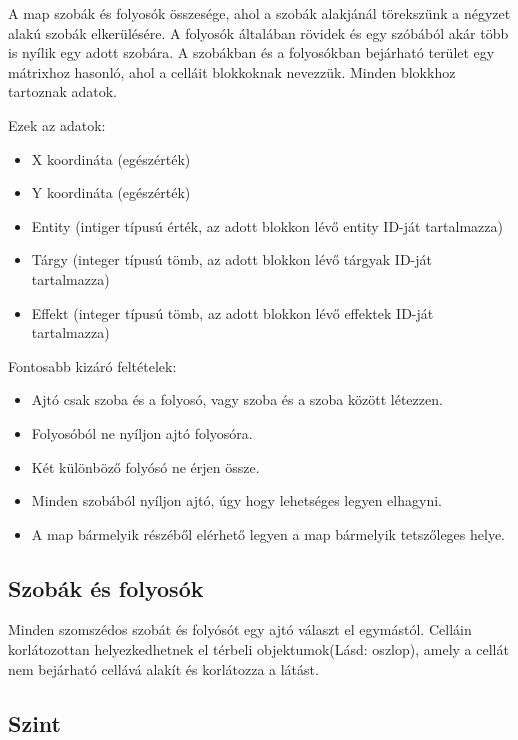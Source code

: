 A map szobák és folyosók összesége, ahol a szobák alakjánál törekszünk a négyzet alakú szobák elkerülésére. A folyosók általában rövidek és egy szóbából akár több is nyílik egy adott szobára.
A szobákban és a folyosókban bejárható terület egy mátrixhoz hasonló, ahol a celláit blokkoknak nevezzük.
Minden blokkhoz tartoznak adatok.

Ezek az adatok:

\begin{itemize}
    \item X koordináta (egészérték)
    \item Y koordináta (egészérték)
    \item Entity (intiger típusú érték,  az adott blokkon lévő entity ID-ját tartalmazza)
    \item Tárgy (integer típusú tömb, az adott blokkon lévő tárgyak ID-ját tartalmazza)
    \item Effekt (integer típusú tömb, az adott blokkon lévő effektek ID-ját tartalmazza)
\end{itemize}

Fontosabb kizáró feltételek:

\begin{itemize}
    \item Ajtó csak szoba és a folyosó, vagy szoba és a szoba között létezzen.
    \item Folyosóból ne nyíljon ajtó folyosóra.
    \item Két különböző folyósó ne érjen össze.
    \item Minden szobából nyíljon ajtó, úgy hogy lehetséges legyen elhagyni.
    \item A map bármelyik részéből elérhető legyen a map bármelyik tetszőleges helye.
\end{itemize}

\subsection{Szobák és folyosók}

Minden szomszédos szobát és folyósót egy ajtó választ el egymástól.
Celláin korlátozottan helyezkedhetnek el térbeli objektumok(Lásd: oszlop), amely a cellát nem bejárható cellává alakít és korlátozza a látást.


\subsection{Szint}

